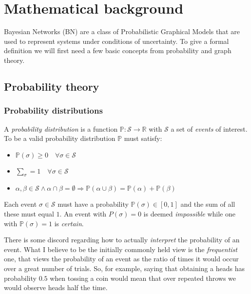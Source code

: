 
\section{Mathematical background}
Bayesian Networks (BN) are a class of Probabilistic Graphical Models that are used to represent systems under conditions of uncertainty.
To give a formal definition we will first need a few basic concepts from probability and graph theory.

\subsection{Probability theory}
\subsubsection{Probability distributions}
\begin{definition}
	A \textit{probability distribution} is a function $\mathbb{P}: \mathcal{S} \rightarrow \mathbb{R}$ with $\mathcal{S}$ a set of \textit{events} of interest.  
To be a valid probability distribution $\mathbb{P}$ must satisfy:
\begin{itemize}
	\item $\mathbb{P}(\sigma) \geq 0 \quad \forall \sigma \in \mathcal{S}$
	\item $\sum_{\sigma} = 1 \quad \forall \sigma \in \mathcal{S}$
	\item $\alpha, \beta \in \mathcal{S} \wedge \alpha \cap \beta=\emptyset 	\Rightarrow \mathbb{P}(\alpha \cup \beta)=\mathbb{P}(\alpha)+\mathbb{P}(\beta)$
\end{itemize}
\end{definition}
Each event $\sigma \in \mathcal{S}$ must have a probability $\mathbb{P}(\sigma) \in [0,1]$ and the sum of all these must equal $1$. 
An event with $P(\sigma) = 0$ is deemed \textit{impossible} while one with $\mathbb{P}(\sigma) = 1$ is \textit{certain}.

There is some discord regarding how to actually \textit{interpret} the probability of an event.
What I believe to be the initially commonly held view is the \textit{frequentist} one, that views the probability of an event as the ratio of times it would occur over a great number of trials.  
So, for example, saying that obtaining a heads has probability $0.5$ when tossing a coin would mean that over repeated throws we would observe heads half the time.

